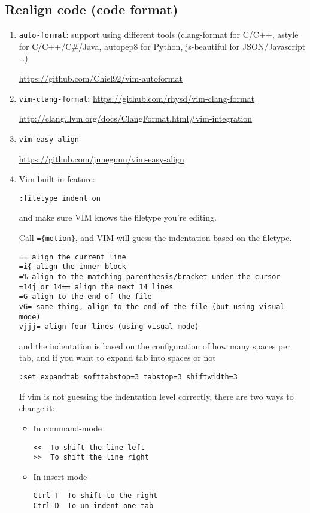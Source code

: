 \subsection{Realign code (code format)}


\begin{enumerate}
  
  \item \verb!auto-format!: support using different tools
  (clang-format for C/C++, astyle for C/C++/C\#/Java, autopep8 for Python,
  js-beautiful for JSON/Javascript \ldots )
  
  \url{https://github.com/Chiel92/vim-autoformat}
  
  
  \item \verb!vim-clang-format!:
  \url{https://github.com/rhysd/vim-clang-format}
  
  \url{http://clang.llvm.org/docs/ClangFormat.html#vim-integration}
  
  \item \verb!vim-easy-align!
  
  \url{https://github.com/junegunn/vim-easy-align}
  
  \item Vim built-in feature:
  
\begin{verbatim}
:filetype indent on
\end{verbatim}
and make sure VIM knows the filetype you're editing.

Call \verb!={motion}!, and VIM will guess the indentation based on the filetype.
\begin{verbatim}
== align the current line
=i{ align the inner block
=% align to the matching parenthesis/bracket under the cursor
=14j or 14== align the next 14 lines
=G align to the end of the file
vG= same thing, align to the end of the file (but using visual mode)
vjjj= align four lines (using visual mode)
\end{verbatim}
and the indentation is based on the configuration of how many spaces per tab,
and if you want to expand tab into spaces or not
\begin{verbatim}
:set expandtab softtabstop=3 tabstop=3 shiftwidth=3
\end{verbatim}

If vim is not guessing the indentation level correctly, there are two ways to
change it:
\begin{itemize}
  \item In command-mode
\begin{verbatim}
<<  To shift the line left
>>  To shift the line right
\end{verbatim}
  \item In insert-mode
\begin{verbatim}
Ctrl-T  To shift to the right
Ctrl-D  To un-indent one tab
\end{verbatim}
\end{itemize}


\end{enumerate}
